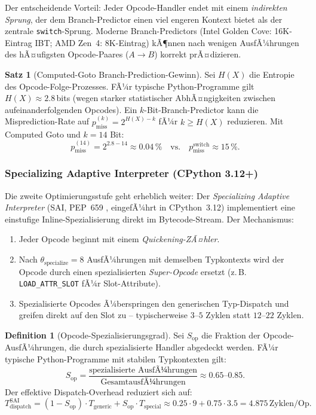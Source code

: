 ﻿\documentclass[a4paper,12pt]{scrreprt}
\theoremstyle{definition}
\newtheorem{definition}{Definition}[section]
\newtheorem{satz}{Satz}[section]
\begin{document}
	Der entscheidende Vorteil: Jeder Opcode-Handler endet mit einem
	\emph{indirekten Sprung}, der dem Branch-Predictor einen viel engeren
	Kontext bietet als der zentrale \texttt{switch}-Sprung. Moderne
	Branch-Predictors (Intel Golden Cove: 16K-Eintrag IBT; AMD Zen~4:
	8K-Eintrag) kÃ¶nnen nach wenigen AusfÃ¼hrungen des hÃ¤ufigsten
	Opcode-Paares ($A \to B$) korrekt prÃ¤dizieren.
	
	\begin{satz}[Computed-Goto Branch-Prediction-Gewinn]
		\label{satz:computed_goto}
		Sei $H(X)$ die Entropie des Opcode-Folge-Prozesses. FÃ¼r typische
		Python-Programme gilt $H(X) \approx 2.8$\,bits (wegen starker
		statistischer AbhÃ¤ngigkeiten zwischen aufeinanderfolgenden Opcodes).
		Ein $k$-Bit-Branch-Predictor kann die Misprediction-Rate auf
		$p_{\mathrm{miss}}^{(k)} = 2^{H(X) - k}$ fÃ¼r $k \ge H(X)$
		reduzieren. Mit Computed Goto und $k = 14$ Bit:
		\[
		p_{\mathrm{miss}}^{(14)} = 2^{2.8 - 14} \approx 0.04\,\%
		\quad \text{vs.} \quad p_{\mathrm{miss}}^{\mathrm{switch}} \approx 15\,\%.
		\]
	\end{satz}
	
	\subsubsection{Specializing Adaptive Interpreter (CPython 3.12+)}
	
	Die zweite Optimierungsstufe geht erheblich weiter: Der
	\emph{Specializing Adaptive Interpreter} (SAI, PEP~659 \cite{pep659},
	eingefÃ¼hrt in CPython~3.12) implementiert eine einstufige
	Inline-Spezialisierung direkt im Bytecode-Stream. Der Mechanismus:
	
	\begin{enumerate}[noitemsep]
		\item Jeder Opcode beginnt mit einem \emph{Quickening-ZÃ¤hler}.
		\item Nach $\theta_{\mathrm{specialize}} = 8$ AusfÃ¼hrungen mit
		demselben Typkontexts wird der Opcode durch einen
		spezialisierten \emph{Super-Opcode} ersetzt
		(z.\,B. \texttt{LOAD\_ATTR\_SLOT} fÃ¼r Slot-Attribute).
		\item Spezialisierte Opcodes Ã¼berspringen den generischen
		Typ-Dispatch und greifen direkt auf den Slot zu --
		typischerweise $3$--$5$ Zyklen statt $12$--$22$ Zyklen.
	\end{enumerate}
	
	\begin{definition}[Opcode-Spezialisierungsgrad]
		\label{def:specialization}
		Sei $S_{\mathrm{op}}$ die Fraktion der Opcode-AusfÃ¼h\-run\-gen, die
		durch spezialisierte Handler abgedeckt werden. FÃ¼r typische
		Python-Programme mit stabilen Typkontexten gilt:
		\[
		S_{\mathrm{op}} = \frac{\text{spezialisierte AusfÃ¼hrungen}}
		{\text{GesamtausfÃ¼hrungen}} \approx 0.65\text{--}0.85.
		\]
		Der effektive Dispatch-Overhead reduziert sich auf:
		\[
		T_{\mathrm{dispatch}}^{\mathrm{SAI}} = (1 - S_{\mathrm{op}}) \cdot T_{\mathrm{generic}}
		+ S_{\mathrm{op}} \cdot T_{\mathrm{special}}
		\approx 0.25 \cdot 9 + 0.75 \cdot 3.5 = 4.875\,\mathrm{Zyklen/Op}.
		\]
	\end{definition}
	
\end{document}
